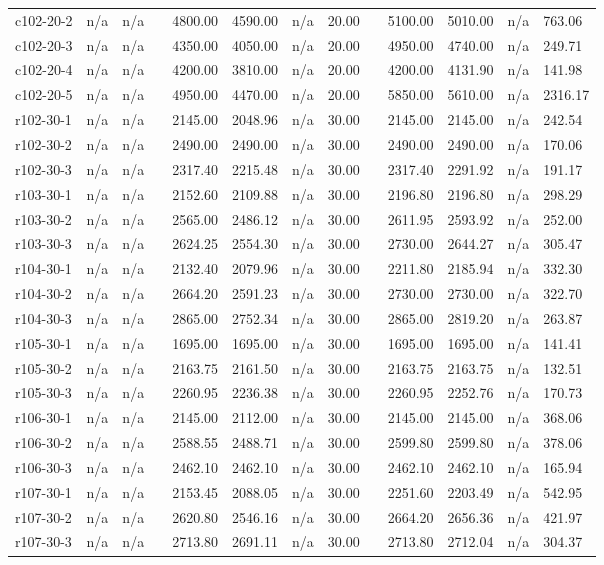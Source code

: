 \documentclass[final,5p,times,twocolumn]{elsarticle}
\begin{document}
{{{{{{{{{{{{{\begin{longtable}{l l l l l l l l l l l l l}
c102-20-2& n/a& n/a&&4800.00& 4590.00& n/a& 20.00&&5100.00& 5010.00& n/a& 763.06\\
c102-20-3& n/a& n/a&&4350.00& 4050.00& n/a& 20.00&&4950.00& 4740.00& n/a& 249.71\\
c102-20-4& n/a& n/a&&4200.00& 3810.00& n/a& 20.00&&4200.00& 4131.90& n/a& 141.98\\
c102-20-5& n/a& n/a&&4950.00& 4470.00& n/a& 20.00&&5850.00& 5610.00& n/a& 2316.17\\
r102-30-1& n/a& n/a&&2145.00& 2048.96& n/a& 30.00&&2145.00& 2145.00& n/a& 242.54\\
r102-30-2& n/a& n/a&&2490.00& 2490.00& n/a& 30.00&&2490.00& 2490.00& n/a& 170.06\\
r102-30-3& n/a& n/a&&2317.40& 2215.48& n/a& 30.00&&2317.40& 2291.92& n/a& 191.17\\
r103-30-1& n/a& n/a&&2152.60& 2109.88& n/a& 30.00&&2196.80& 2196.80& n/a& 298.29\\
r103-30-2& n/a& n/a&&2565.00& 2486.12& n/a& 30.00&&2611.95& 2593.92& n/a& 252.00\\
r103-30-3& n/a& n/a&&2624.25& 2554.30& n/a& 30.00&&2730.00& 2644.27& n/a& 305.47\\
r104-30-1& n/a& n/a&&2132.40& 2079.96& n/a& 30.00&&2211.80& 2185.94& n/a& 332.30\\
r104-30-2& n/a& n/a&&2664.20& 2591.23& n/a& 30.00&&2730.00& 2730.00& n/a& 322.70\\
r104-30-3& n/a& n/a&&2865.00& 2752.34& n/a& 30.00&&2865.00& 2819.20& n/a& 263.87\\
r105-30-1& n/a& n/a&&1695.00& 1695.00& n/a& 30.00&&1695.00& 1695.00& n/a& 141.41\\
r105-30-2& n/a& n/a&&2163.75& 2161.50& n/a& 30.00&&2163.75& 2163.75& n/a& 132.51\\
r105-30-3& n/a& n/a&&2260.95& 2236.38& n/a& 30.00&&2260.95& 2252.76& n/a& 170.73\\
r106-30-1& n/a& n/a&&2145.00& 2112.00& n/a& 30.00&&2145.00& 2145.00& n/a& 368.06\\
r106-30-2& n/a& n/a&&2588.55& 2488.71& n/a& 30.00&&2599.80& 2599.80& n/a& 378.06\\
r106-30-3& n/a& n/a&&2462.10& 2462.10& n/a& 30.00&&2462.10& 2462.10& n/a& 165.94\\
r107-30-1& n/a& n/a&&2153.45& 2088.05& n/a& 30.00&&2251.60& 2203.49& n/a& 542.95\\
r107-30-2& n/a& n/a&&2620.80& 2546.16& n/a& 30.00&&2664.20& 2656.36& n/a& 421.97\\
r107-30-3& n/a& n/a&&2713.80& 2691.11& n/a& 30.00&&2713.80& 2712.04& n/a& 304.37\\

\end{longtable}}}}}}}}}}}}}}
\end{document}
